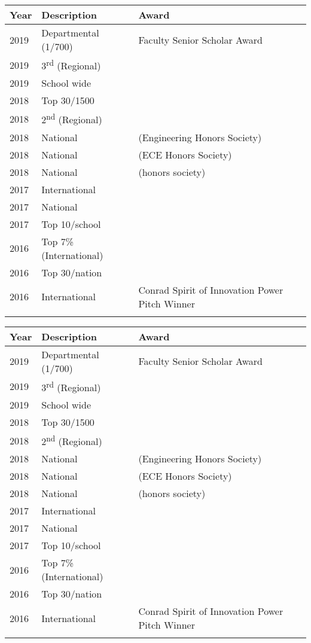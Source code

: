\newcommand{\awardscontent}{%
	\textbf{Year}        &
	\textbf{Description} &
	\textbf{Award}                                                                                                \\
	\midrule
	\awardshigh{}2019    & Departmental (1/700)             & Faculty Senior Scholar Award                        \\
	\awardslow{}2019     & 3\textsuperscript{rd} (Regional) & \ieeeweb{IEEE Website Design Competition}           \\
	\awardslow{}2019     & School wide                      & \fintech{Carolina FinTech University Winner}        \\
	\awardshigh{}2018    & Top 30/1500                      & \nba{NBA Hackathon Finalist}                        \\
	\awardshigh{}2018    & 2\textsuperscript{nd} (Regional) & \ieeehacks{IEEE SouthEastCon Hackathon}             \\
	\awardslow{}2018     & National                         & \tbp{Tau Beta Pi} (Engineering Honors Society)      \\
	\awardslow{}2018     & National                         & \hkn{IEEE Eta Kappa Nu} (ECE Honors Society)        \\
	\awardslow{}2018     & National                         & \pkp{Phi Kappa Phi} (honors society)                \\
	\awardshigh{}2017    & International                    & \first{\acr{FIRST} Robotics World Quarter Finalist} \\
	\awardshigh{}2017    & National                         & \ibm{IBM Watson Scholar}                            \\
	\awardslow{}2017     & Top 10/school                    & \bbs{Bowman Brockman Endowded Scholar}              \\
	\awardshigh{}2016    & Top 7\% (International)          & \himcm{HiMCM Finalist}                              \\
	\awardshigh{}2016    & Top 30/nation                    & \beaver{MIT Beaverworks Robotics Institute}         \\
	\awardslow{}2016     & International                    & Conrad Spirit of Innovation Power Pitch Winner      \\
}

\makeatletter%
\if@twocolumn%
	\renewcommand{\arraystretch}{1.1}
	\begin{table}[h!]
		\small
		\begin{tabularx}{\columnwidth}{l l p{5.2cm}}
			\awardscontent{}
		\end{tabularx}
	\end{table}
\else%
	\begin{table}[h!]
		\begin{tabular}{lll}
			\awardscontent{}
		\end{tabular}
	\end{table}
	\FloatBarrier%
\fi
\makeatother

